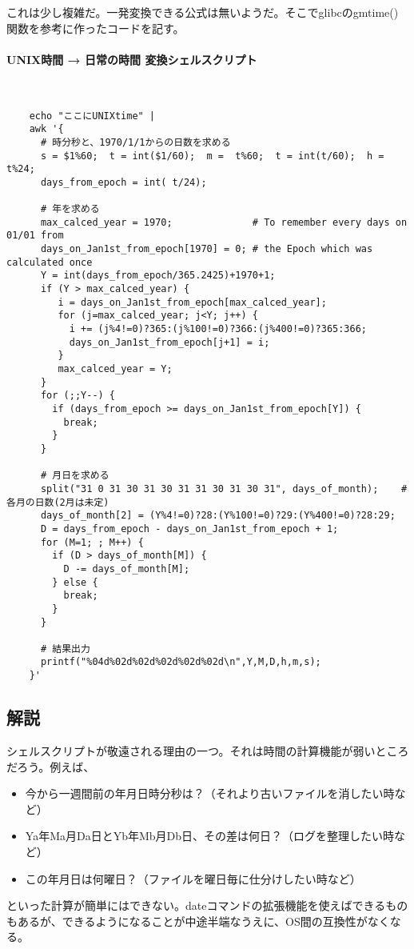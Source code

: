 これは少し複雑だ。一発変換できる公式は無いようだ。そこでglibcのgmtime()関数を参考に作ったコードを記す。
\paragraph{UNIX時間 → 日常の時間 変換シェルスクリプト}　\\
\begin{frameboxit}{160.0mm}
\begin{verbatim}
	echo "ここにUNIXtime" |
	awk '{
	  # 時分秒と、1970/1/1からの日数を求める
	  s = $1%60;  t = int($1/60);  m =  t%60;  t = int(t/60);  h = t%24;
	  days_from_epoch = int( t/24);

	  # 年を求める
	  max_calced_year = 1970;              # To remember every days on 01/01 from
	  days_on_Jan1st_from_epoch[1970] = 0; # the Epoch which was calculated once
	  Y = int(days_from_epoch/365.2425)+1970+1;
	  if (Y > max_calced_year) {
	     i = days_on_Jan1st_from_epoch[max_calced_year];
	     for (j=max_calced_year; j<Y; j++) {
	       i += (j%4!=0)?365:(j%100!=0)?366:(j%400!=0)?365:366;
	       days_on_Jan1st_from_epoch[j+1] = i;
	     }
	     max_calced_year = Y;
	  }
	  for (;;Y--) {
	    if (days_from_epoch >= days_on_Jan1st_from_epoch[Y]) {
	      break;
	    }
	  }

	  # 月日を求める
	  split("31 0 31 30 31 30 31 31 30 31 30 31", days_of_month);    # 各月の日数(2月は未定)
	  days_of_month[2] = (Y%4!=0)?28:(Y%100!=0)?29:(Y%400!=0)?28:29;
	  D = days_from_epoch - days_on_Jan1st_from_epoch + 1;
	  for (M=1; ; M++) {
	    if (D > days_of_month[M]) {
	      D -= days_of_month[M];
	    } else {
	      break;
	    }
	  }

	  # 結果出力
	  printf("%04d%02d%02d%02d%02d%02d\n",Y,M,D,h,m,s);
	}'
\end{verbatim}
\end{frameboxit}

\subsection*{解説}

シェルスクリプトが敬遠される理由の一つ。それは時間の計算機能が弱いところだろう。例えば、
\begin{itemize}
  \item 今から一週間前の年月日時分秒は？（それより古いファイルを消したい時など）
  \item Ya年Ma月Da日とYb年Mb月Db日、その差は何日？（ログを整理したい時など）
  \item この年月日は何曜日？（ファイルを曜日毎に仕分けしたい時など）
\end{itemize}
といった計算が簡単にはできない。dateコマンドの拡張機能を使えばできるものもあるが、できるようになることが中途半端なうえに、OS間の互換性がなくなる。

